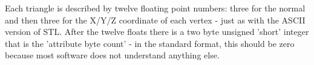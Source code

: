 \noindent
Each triangle is described by twelve floating point numbers: three for the normal and then three for the X/Y/Z coordinate of each vertex - just as with the ASCII version of STL. After the twelve floats there is a two byte unsigned 'short' integer that is the 'attribute byte count' - in the standard format, this should be zero because most software does not understand anything else.